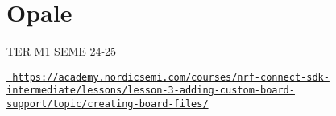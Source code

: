 \chapter{Opale}
\hypertarget{md__r_e_a_d_m_e}{}\label{md__r_e_a_d_m_e}
\label{md__r_e_a_d_m_e_autotoc_md0}%
%


TER M1 SEME 24-\/25

\href{https://academy.nordicsemi.com/courses/nrf-connect-sdk-intermediate/lessons/lesson-3-adding-custom-board-support/topic/creating-board-files/}{\texttt{ https\+://academy.\+nordicsemi.\+com/courses/nrf-\/connect-\/sdk-\/intermediate/lessons/lesson-\/3-\/adding-\/custom-\/board-\/support/topic/creating-\/board-\/files/}} 